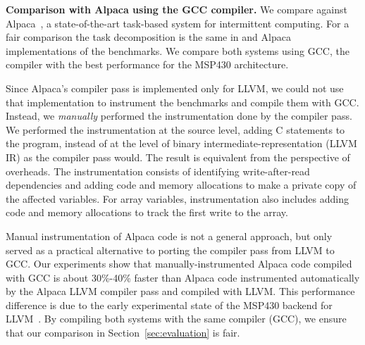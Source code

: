 
\textbf{Comparison with Alpaca using the GCC compiler.} We compare
\sys against Alpaca~\cite{alpaca}, a state-of-the-art task-based system for
intermittent computing. For a fair comparison the task decomposition is the
same in \sys and Alpaca implementations of the benchmarks. We compare
both systems using GCC, the compiler with the best performance for the
MSP430 architecture.

Since Alpaca's compiler pass is implemented only for LLVM, we could not use
that implementation to instrument the benchmarks and compile them with GCC.
Instead, we \emph{manually} performed the instrumentation done by the compiler
pass.  We performed the instrumentation at the source level, adding C
statements to the program, instead of at the level of binary
intermediate-representation (LLVM IR) as the compiler pass would. The result is
equivalent from the perspective of overheads. The instrumentation consists of
identifying write-after-read dependencies and adding code and memory
allocations to make a private copy of the affected variables. For array
variables, instrumentation also includes adding code and memory allocations to
track the first write to the array.

Manual instrumentation of Alpaca code is not a general approach, but only
served as a practical alternative to porting the compiler pass from LLVM to
GCC.
%
Our experiments show that manually-instrumented Alpaca code compiled with GCC
is about 30\%-40\% faster than Alpaca code instrumented automatically by the
Alpaca LLVM compiler pass and compiled with LLVM. This performance difference
is due to the early experimental state of the MSP430 backend for
LLVM~\cite{baghsorkhi_cgo_2018}.
%
By compiling both systems with the same compiler (GCC), we ensure that our
comparison in Section~\ref{sec:evaluation} is fair.

